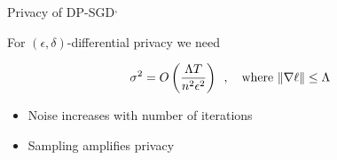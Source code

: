 \documentclass[17pt,aspectratio=169]{beamer}
\begin{document}
\begin{frame}{Privacy of DP-SGD$^{,\hspace{0.1em}}$}




  For $(\epsilon,\delta)$-differential privacy we need

  \begin{align*}
    \sigma^2 = O\left(\frac{\Lambda T}{n^2 \epsilon^2}\right)
    \enspace,
    \enspace \enspace
    \text{where } \| \nabla \ell \| \le \Lambda
  \end{align*}

  \vspace{0.5em}

  \begin{itemize}
  \item Noise increases with number of iterations
  \item Sampling amplifies privacy
  \end{itemize}

  \vspace{1em}

\end{frame}
\end{document}
